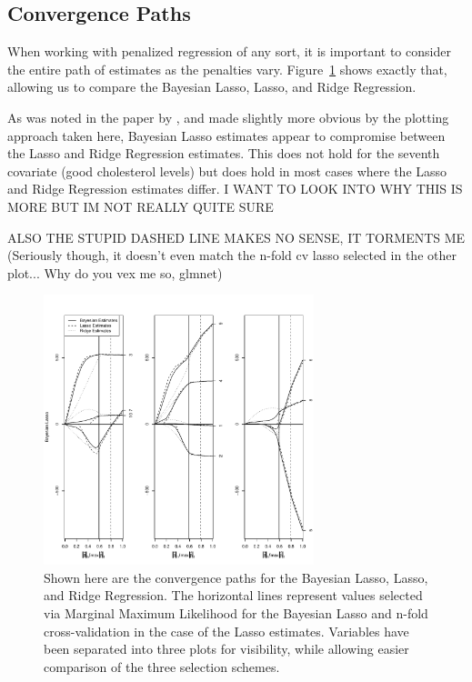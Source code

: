 \documentclass{uwstat572}
\begin{document}
\subsection{Convergence Paths}
When working with penalized regression of any sort, it is important to consider the entire path of estimates as the penalties vary. Figure~\ref{convergence} shows exactly that, allowing us to compare the Bayesian Lasso, Lasso, and Ridge Regression. 

As was noted in the paper by \cite{park2008bayesian}, and made slightly more obvious by the plotting approach taken here, Bayesian Lasso estimates appear to compromise between the Lasso and Ridge Regression estimates. This does not hold for the seventh covariate (good cholesterol levels) but does hold in most cases where the Lasso and Ridge Regression estimates differ. I WANT TO LOOK INTO WHY THIS IS MORE BUT IM NOT REALLY QUITE SURE

ALSO THE STUPID DASHED LINE MAKES NO SENSE, IT TORMENTS ME (Seriously though, it doesn't even match the n-fold cv lasso selected in the other plot... Why do you vex me so, glmnet)

\begin{figure}\label{convergence}
  \centering
    \includegraphics[width=0.7\textwidth]{SaveFigure1.pdf}
  \caption{Shown here are the convergence paths for the Bayesian Lasso, Lasso, and Ridge Regression. The horizontal lines represent values selected via Marginal Maximum Likelihood for the Bayesian Lasso and n-fold cross-validation in the case of the Lasso estimates. Variables have been separated into three plots for visibility, while allowing easier comparison of the three selection schemes.}
\end{figure}
\end{document}
